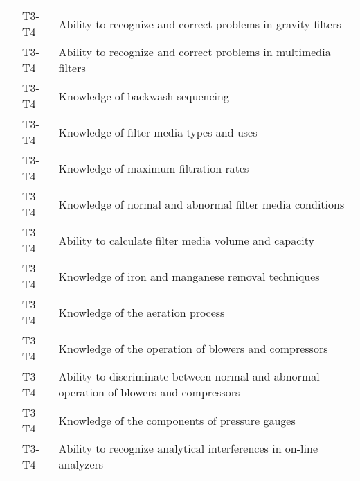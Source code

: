 \begin{table}[H]
\begin{tabular}{| m{1cm} | m{1cm} | m{12cm} |}
\multicolumn{1}{l|}{} & \multicolumn{1}{l|}{T3-T4} & Ability to recognize   and correct problems in gravity filters                             \\ \cline{2-3} 
\multicolumn{1}{l|}{} & \multicolumn{1}{l|}{T3-T4} & Ability to recognize   and correct problems in multimedia filters                          \\ \cline{2-3} 
\multicolumn{1}{l|}{} & \multicolumn{1}{l|}{T3-T4} & Knowledge of backwash   sequencing                                                         \\ \cline{2-3} 
\multicolumn{1}{l|}{} & \multicolumn{1}{l|}{T3-T4} & Knowledge of filter   media types and uses                                                 \\ \cline{2-3} 
\multicolumn{1}{l|}{} & \multicolumn{1}{l|}{T3-T4} & Knowledge of maximum   filtration rates                                                    \\ \cline{2-3} 
\multicolumn{1}{l|}{} & \multicolumn{1}{l|}{T3-T4} & Knowledge of normal   and abnormal filter media conditions                                 \\ \cline{2-3} 
\multicolumn{1}{l|}{} & \multicolumn{1}{l|}{T3-T4} & Ability to calculate   filter media volume and capacity                                    \\ \cline{2-3} 
\multicolumn{1}{l|}{} & \multicolumn{1}{l|}{T3-T4} & Knowledge of iron and   manganese removal techniques                                       \\ \cline{2-3} 
\multicolumn{1}{l|}{} & \multicolumn{1}{l|}{T3-T4} & Knowledge of the   aeration process                                                        \\ \cline{2-3} 
\multicolumn{1}{l|}{} & \multicolumn{1}{l|}{T3-T4} & Knowledge of the   operation of blowers and compressors                                    \\ \cline{2-3} 
\multicolumn{1}{l|}{} & \multicolumn{1}{l|}{T3-T4} & Ability to   discriminate between normal and abnormal operation of blowers and compressors \\ \cline{2-3} 
\multicolumn{1}{l|}{} & \multicolumn{1}{l|}{T3-T4} & Knowledge of the   components of pressure gauges                                           \\ \cline{2-3} 
\multicolumn{1}{l|}{} & \multicolumn{1}{l|}{T3-T4} & Ability to recognize   analytical interferences in on-line analyzers                       \\ \cline{2-3} 

\end{tabular}
\end{table}
